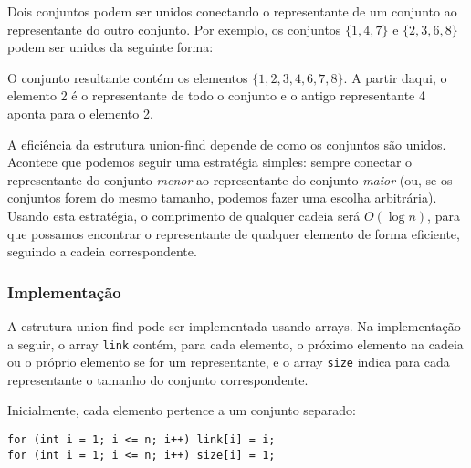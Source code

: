 Dois conjuntos podem ser unidos conectando o 
representante de um conjunto ao 
representante do outro conjunto. 
Por exemplo, os conjuntos
$\{1,4,7\}$ e $\{2,3,6,8\}$ 
podem ser unidos da seguinte forma:
\begin{center}
\end{center}

O conjunto resultante contém os elementos
$\{1,2,3,4,6,7,8\}$.
A partir daqui, o elemento 2 é o representante 
de todo o conjunto e o antigo representante 4 
aponta para o elemento 2.

A eficiência da estrutura union-find depende de 
como os conjuntos são unidos. 
Acontece que podemos seguir uma estratégia simples: 
sempre conectar o representante do conjunto 
\emph{menor} ao representante do conjunto \emph{maior} 
(ou, se os conjuntos forem do mesmo tamanho, 
podemos fazer uma escolha arbitrária). 
Usando esta estratégia, o comprimento de qualquer cadeia 
será $O(\log n)$, para que possamos 
encontrar o representante de qualquer elemento 
de forma eficiente, seguindo a cadeia correspondente.

\subsubsection{Implementação}

A estrutura union-find pode ser implementada 
usando arrays. 
Na implementação a seguir, 
o array \texttt{link} contém, para cada elemento, 
o próximo elemento 
na cadeia ou o próprio elemento se for 
um representante, 
e o array \texttt{size} indica para cada representante 
o tamanho do conjunto correspondente.

Inicialmente, cada elemento pertence a um conjunto separado:
\begin{lstlisting}
for (int i = 1; i <= n; i++) link[i] = i;
for (int i = 1; i <= n; i++) size[i] = 1;
\end{lstlisting}

